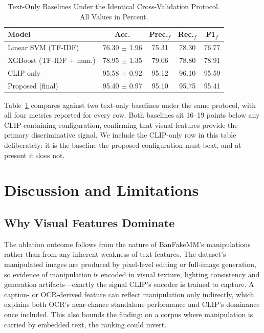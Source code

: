 \documentclass[conference,a4paper]{IEEEtran}
\begin{document}
\begin{table}[t]
\caption{Text-Only Baselines Under the Identical Cross-Validation Protocol.
All Values in Percent.}
\label{tab:baselines}
\centering
\setlength{\tabcolsep}{3.5pt}
\begin{tabular}{lcccc}
\toprule
\textbf{Model} & \textbf{Acc.} & \textbf{Prec.$_{f}$} &
\textbf{Rec.$_{f}$} & \textbf{F1$_{f}$} \\
\midrule
Linear SVM (TF-IDF)     & 76.30 $\pm$ 1.96 & 75.31 & 78.30 & 76.77 \\
XGBoost (TF-IDF + num.) & 78.95 $\pm$ 1.35 & 79.06 & 78.80 & 78.91 \\
\midrule
CLIP only               & 95.58 $\pm$ 0.92 & 95.12 & 96.10 & 95.59 \\
Proposed (final)        & 95.40 $\pm$ 0.97 & 95.10 & 95.75 & 95.41 \\
\bottomrule
\end{tabular}
\end{table}

Table~\ref{tab:baselines} compares against two text-only baselines under the
same protocol, with all four metrics reported for every row. Both baselines
sit 16--19 points below any CLIP-containing configuration, confirming that
visual features provide the primary discriminative signal. We include the
CLIP-only row in this table deliberately: it is the baseline the proposed
configuration must beat, and at present it does not.

\section{Discussion and Limitations}

\subsection{Why Visual Features Dominate}

The ablation outcome follows from the nature of BanFakeMM's manipulations
rather than from any inherent weakness of text features. The dataset's
manipulated images are produced by pixel-level editing or full-image
generation, so evidence of manipulation is encoded in visual texture, lighting
consistency and generation artifacts---exactly the signal CLIP's encoder is
trained to capture. A caption- or OCR-derived feature can reflect manipulation
only indirectly, which explains both OCR's near-chance standalone performance
and CLIP's dominance once included. This also bounds the finding: on a corpus
where manipulation is carried by embedded text, the ranking could invert.
\end{document}
